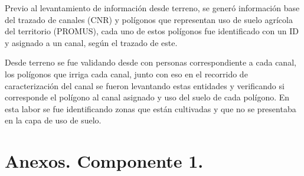 \documentclass[]{article}
\begin{document}
Previo al levantamiento de información desde terreno, se generó información base del trazado de canales (CNR) y polígonos que representan uso de suelo agrícola del territorio (PROMUS), cada uno de estos polígonos fue identificado  con un ID y asignado a un canal, según el trazado de este.

Desde terreno se fue validando desde con personas correspondiente a cada canal, los polígonos que irriga cada canal, junto con eso en el recorrido de caracterización del canal se fueron levantando estas entidades y verificando si corresponde el polígono al canal asignado y uso del suelo de cada polígono. En esta labor se fue identificando zonas que están cultivadas y que no se presentaba en la capa de uso de suelo.




\section{Anexos. Componente 1.}
\end{document}
